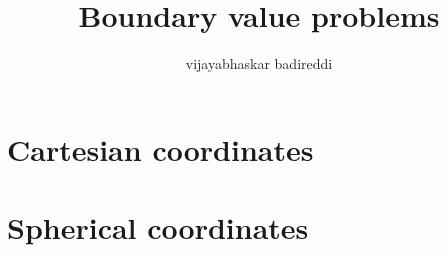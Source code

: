 \documentclass[12pt]{article}
\title{Boundary value problems}
\author{vijayabhaskar badireddi}
\date{}
\begin{document}
\section*{Cartesian coordinates}
\section*{Spherical coordinates}
\end{document}
